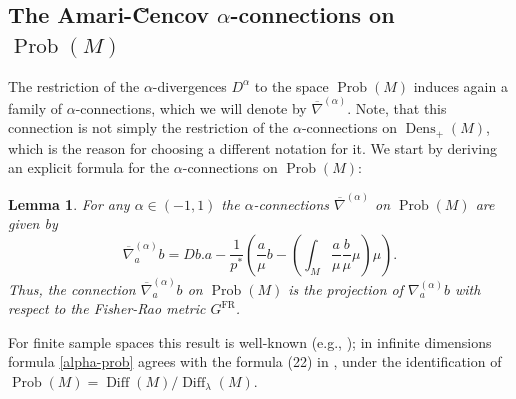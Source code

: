 \documentclass[11pt]{amsart}
\newtheorem{lemma}[theorem]{Lemma}
\theoremstyle{definition}
\newcommand{\dx}{\lambda}
\newcommand{\Prob}{\operatorname{Prob}(M)}
\newcommand{\Dens}{\operatorname{Dens}_+(M)}
\newcommand{\Diff}{\operatorname{Diff}(M)}
\newcommand{\SDiff}{\operatorname{Diff}_{\dx}(M)}
\newcommand{\GFR}{G^{\mathrm{FR}}}
\newcommand{\nablabar}{\overline{\nabla}}
\begin{document}
\subsection{The Amari-\u{C}encov $\alpha$-connections on $\Prob$}
The restriction of the $\alpha$-divergences $D^{\alpha}$ to the space $\Prob$ induces again a family of $\alpha$-connections, which we will denote by  $\nablabar^{(\alpha)}$. Note, that this connection is not simply the restriction of the $\alpha$-connections on $\Dens$, which is the reason for choosing a different notation for it.
We start by deriving an explicit formula for the $\alpha$-connections on $\Prob$: 
\begin{lemma}
 For any $\alpha\in (-1,1)$ the $\alpha$-connections $\nablabar^{(\alpha)}$ on $\Prob$ are given by
    \begin{equation}\label{alpha-prob}
    \nablabar^{(\alpha)}_a b = Db.a - \frac{1}{p^*} \left(\frac{a}{\mu}b -\left(\int_M \frac{a}{\mu}\frac{b}{\mu} \mu\right)\mu\right).
    \end{equation}
Thus, the connection  $\nablabar^{(\alpha)}_a b$ on $\Prob$ is the projection of $\nabla^{(\alpha)}_a b$ with respect to the Fisher-Rao metric $\GFR$.    
\end{lemma}

For finite sample spaces this result is well-known (e.g., \cite[Section~2.5.2]{ay2017information});
in infinite dimensions formula \eqref{alpha-prob} agrees with the formula (22) in \cite{lenells2014amari}, under the identification of $\Prob = \Diff/\SDiff$.
\end{document}
